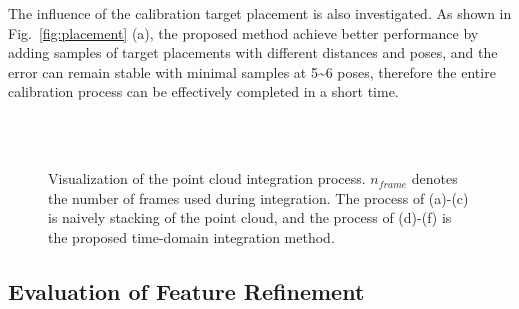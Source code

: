 \documentclass[journal]{vgtc}
\begin{document}

The influence of the calibration target placement is also investigated. As shown in Fig.~\ref{fig:placement} (a), the proposed method achieve better performance by adding samples of target placements with different distances and poses, and the error can remain stable with minimal samples at 5\textasciitilde6 poses, therefore the entire calibration process can be effectively completed in a short time.




\begin{figure}[!htb]
	\centering
	\\[-2ex]
	\\[-1ex]
	\caption{Visualization of the point cloud integration process. $n_{frame}$ denotes the number of frames used during integration. The process of (a)-(c) is naively stacking of the point cloud, and the process of (d)-(f) is the proposed time-domain integration method. }
	\label{fig:integration_visualization} 
	
\end{figure}




\subsection{Evaluation of Feature Refinement}
\end{document}
